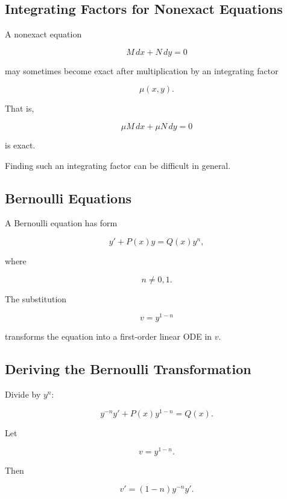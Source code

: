 \subsection{Integrating Factors for Nonexact Equations}
\label{subsec:integrating-factors-nonexact}

A nonexact equation

\[
M\,dx+N\,dy=0
\]

may sometimes become exact after multiplication by an integrating factor

\[
\boxed{
\mu(x,y).
}
\]

That is,

\[
\boxed{
\mu M\,dx
+
\mu N\,dy
=
0
}
\]

is exact.

Finding such an integrating factor can be difficult in general.

\subsection{Bernoulli Equations}
\label{subsec:bernoulli-equations}

A Bernoulli equation has form

\[
\boxed{
y'
+
P(x)y
=
Q(x)y^n,
}
\]

where

\[
n\neq0,1.
\]

The substitution

\[
\boxed{
v
=
y^{1-n}
}
\]

transforms the equation into a first-order linear ODE in \(v\).

\subsection{Deriving the Bernoulli Transformation}
\label{subsec:bernoulli-transformation}

Divide by \(y^n\):

\[
y^{-n}y'
+
P(x)y^{1-n}
=
Q(x).
\]

Let

\[
v=y^{1-n}.
\]

Then

\[
v'
=
(1-n)y^{-n}y'.
\]

